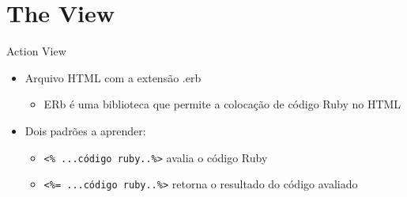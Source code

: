 \section{The View}
\begin{frame}[t, fragile]{Action View}
	\begin{itemize}
		\item Arquivo HTML com a extensão \alert{.erb}
		\begin{itemize}
			\item ERb é uma \alert{biblioteca} que permite a colocação de código Ruby no HTML
		\end{itemize}

		\item Dois padrões a aprender:
		\begin{itemize}
			\item  \verb|<% ...código ruby..%>| avalia o código Ruby
			\item  \verb|<%= ...código ruby..%>| retorna o resultado do código avaliado 
		\end{itemize}		
		
	\end{itemize}	
\end{frame}